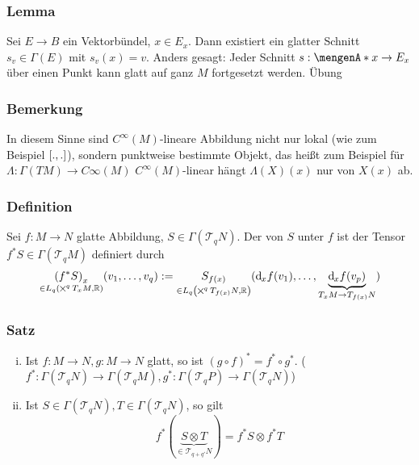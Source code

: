 \subsubsection{Lemma}
\label{ssub:179}
Sei $E\to B$ ein Vektorbündel, $x\in E_x$. Dann existiert ein glatter Schnitt $s_v\in \Gamma(E)$ mit $s_v(x) = v$. Anders gesagt: Jeder Schnitt $s:\set{x}\to E_x$ über einen Punkt kann glatt auf ganz $M$ fortgesetzt werden.
Übung

\subsubsection{Bemerkung}
\label{ssub:180}
In diesem Sinne sind $C^\infty (M)$-lineare Abbildung nicht nur lokal (wie zum Beispiel $\benbrace{.,.}$), sondern punktweise bestimmte Objekt, das heißt zum Beispiel für $\Lambda:\Gamma(TM)\to C\infty(M)$ $C^\infty(M)$-linear hängt $\Lambda(X)(x)$ nur von $X(x)$ ab.

\subsubsection{Definition}
\label{ssub:181}
Sei $f:M\to N$ glatte Abbildung, $S\in \Gamma(\mathcal{T}_q N)$. Der  von $S$ unter $f$ ist der Tensor $f^* S \in \Gamma(\mathcal{T}_q M)$ definiert durch
\[
\underset{\in L_q \enbrace*{\bigtimes^q T_x M,\mathds{R}}}{\enbrace*{f^* S}_x} \enbrace{v_1,\ldots,v_q} := \underset{\in L_q \enbrace*{\bigtimes^q T_{f(x)} N,\mathds{R}}}{S_{f(x)}} \enbrace{\mathd_x f(v_1),\ldots,\underbrace{\mathd_x f(v_p)}_{T_x M \to T_{f(x)} N}}
\]

\subsubsection[Satz:Funktionelle Eigenschaften]{Satz}
\label{ssub:182}
\begin{enumerate}[(i)]
\item Ist $f:M\to N,g:M\to N$ glatt, so ist $(g\circ f)^* = f^*\circ g^*$. ($f^*:\Gamma(\mathcal{T}_q N)\to \Gamma(\mathcal{T}_q M),g^*:\Gamma(\mathcal{T}_q P)\to \Gamma(\mathcal{T}_q N)$)
\item Ist $S\in \Gamma(\mathcal{T}_q N), T\in \Gamma(\mathcal{T}_q N)$, so gilt
\[
f^*(\underbrace{S\otimes T}_{\in \mathcal{T}_{q+q'} N}) = f^* S \otimes f^* T
\]
\end{enumerate}

